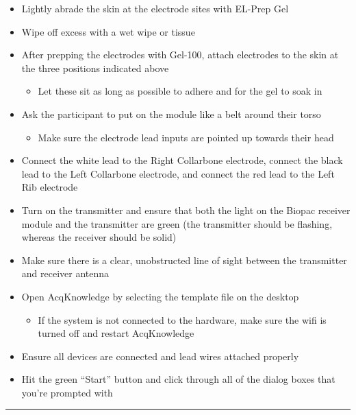 \documentclass[
]{book}
\providecommand{\tightlist}{%
  \setlength{\itemsep}{0pt}\setlength{\parskip}{0pt}}
\begin{document}
\begin{itemize}
\tightlist
\item
  Lightly abrade the skin at the electrode sites with EL-Prep Gel
\item
  Wipe off excess with a wet wipe or tissue
\item
  After prepping the electrodes with Gel-100, attach electrodes to the skin at the three positions indicated above

  \begin{itemize}
  \tightlist
  \item
    Let these sit as long as possible to adhere and for the gel to soak in
  \end{itemize}
\item
  Ask the participant to put on the module like a belt around their torso

  \begin{itemize}
  \tightlist
  \item
    Make sure the electrode lead inputs are pointed up towards their head
  \end{itemize}
\item
  Connect the white lead to the Right Collarbone electrode, connect the black lead to the Left Collarbone electrode, and connect the red lead to the Left Rib electrode
\item
  Turn on the transmitter and ensure that both the light on the Biopac receiver module and the transmitter are green (the transmitter should be flashing, whereas the receiver should be solid)
\item
  Make sure there is a clear, unobstructed line of sight between the transmitter and receiver antenna
\item
  Open AcqKnowledge by selecting the template file on the desktop

  \begin{itemize}
  \tightlist
  \item
    If the system is not connected to the hardware, make sure the wifi is turned off and restart AcqKnowledge
  \end{itemize}
\item
  Ensure all devices are connected and lead wires attached properly
\item
  Hit the green ``Start'' button and click through all of the dialog boxes that you're prompted with
\end{itemize}

\begin{center}\rule{0.5\linewidth}{0.5pt}\end{center}
\end{document}
